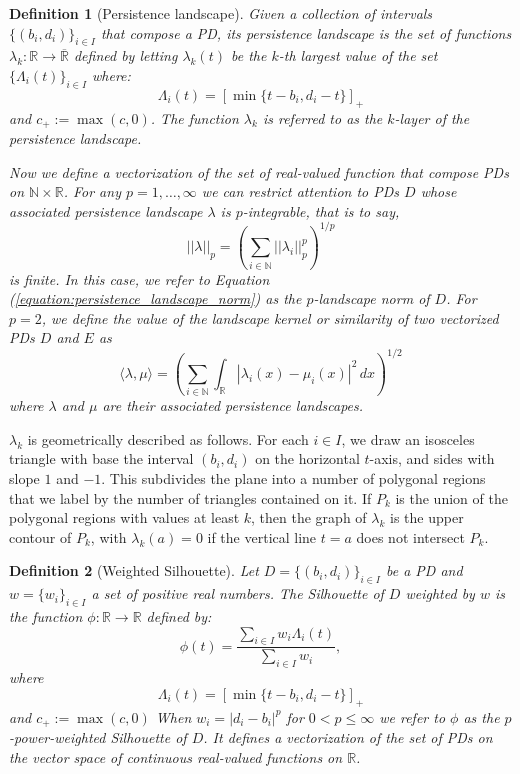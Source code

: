 \documentclass{article}
\newtheorem{definition}{Definition}
\begin{document}
\begin{definition}[Persistence landscape]
Given a collection of intervals $\{(b_i, d_i)\}_{i \in I}$ that compose a PD, its \emph{persistence landscape} is the set of functions $\lambda_k: \mathbb R \to \overline{\mathbb R}$ defined by letting $\lambda_k(t)$ be the $k$-th largest value of the set $\{\Lambda_i(t)\}_ {i \in I}$ where:
\begin{equation}
\Lambda_i(t) = \left[ \min \{t-b_i, d_i-t\}\right]_+    
\end{equation}
and $c_+ := \max(c,0)$. The function $\lambda_k$ is referred to as the $k$-layer of the persistence landscape.

Now we define a vectorization of the set of real-valued function that compose PDs on $\mathbb N \times \mathbb R$. For any $p = 1,\dots,\infty$ we can restrict attention to PDs $D$ whose associated persistence landscape $\lambda$ is $p$-integrable, that is to say,
\begin{equation}
    \label{equation:persistence_landscape_norm}
    ||\lambda||_p = \left( \sum_{i \in \mathbb N} ||\lambda_i||^p_p \right)^{1/p}
\end{equation}
is finite. In this case, we refer to Equation (\ref{equation:persistence_landscape_norm}) as the $p$-landscape norm of $D$. For $p = 2$, we define the value of the \emph{landscape kernel} or similarity of two vectorized PDs $D$ and $E$ as
\begin{equation}
    \langle \lambda, \mu \rangle = \left(\sum_{i \in \mathbb N} \int_{\mathbb R} |\lambda_i(x) - \mu_i(x)|^2\, dx\right)^{1/2}
\end{equation}
where $\lambda$ and $\mu$ are their associated persistence landscapes.
\end{definition}
$\lambda_k$ is geometrically described as follows. For each $i \in I$, we draw an isosceles triangle with base the interval $(b_i, d_i)$ on the horizontal $t$-axis, and sides with slope $1$ and $-1$. This subdivides the plane into a number of polygonal regions that we label by the number of triangles contained on it. If $P_k$ is the union of the polygonal regions with values at least $k$, then the graph of $\lambda_k$ is the upper contour of $P_k$, with $\lambda_k(a) = 0$ if the vertical line $t=a$ does not intersect $P_k$.

\begin{definition}[Weighted Silhouette]
Let $D = \{(b_i, d_i)\}_{i \in I}$ be a PD and $w = \{w_i\}_{i \in I}$ a set of positive real numbers. The Silhouette of $D$ weighted by $w$ is the function $\phi: \mathbb R \to \mathbb R$ defined by:
\begin{equation}
    \phi(t) = \frac{\sum_{i \in I}w_i \Lambda_i(t)}{\sum_{i \in I}w_i},
\end{equation}
where
\begin{equation}
    \Lambda_i(t) = \left[ \min \{t-b_i, d_i-t\}\right]_+
\end{equation}
and $c_+ := \max(c,0)$ When $w_i = \vert d_i - b_i \vert^p$ for $0 < p \leq \infty$ we refer to $\phi$ as the $p$-power-weighted Silhouette of $D$. It defines a vectorization of the set of PDs on the vector space of continuous real-valued functions on $\mathbb R$.
\end{definition}
\end{document}
